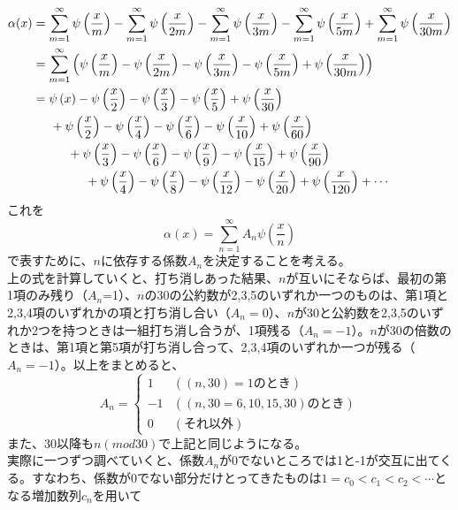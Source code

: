 \documentclass{jsarticle}
\begin{document}
\begin{align*}
\alpha(x)&=\sum_{m=1}^{\infty}\psi\left(\frac{x}{m}\right)-\sum_{m=1}^{\infty}\psi\left(\frac{x}{2m}\right)-\sum_{m=1}^{\infty}\psi\left(\frac{x}{3m}\right)-\sum_{m=1}^{\infty}\psi\left(\frac{x}{5m}\right)+\sum_{m=1}^{\infty}\psi\left(\frac{x}{30m}\right)\\
&=\sum_{m=1}^{\infty}\left(\psi\left(\frac{x}{m}\right)-\psi\left(\frac{x}{2m}\right)-\psi\left(\frac{x}{3m}\right)-\psi\left(\frac{x}{5m}\right)+\psi\left(\frac{x}{30m}\right)\right)\\
&=\psi\left(x\right)-\psi\left(\frac{x}{2}\right)-\psi\left(\frac{x}{3}\right)-\psi\left(\frac{x}{5}\right)+\psi\left(\frac{x}{30}\right)\\
&\hspace{5mm}+\psi\left(\frac{x}{2}\right)-\psi\left(\frac{x}{4}\right)-\psi\left(\frac{x}{6}\right)-\psi\left(\frac{x}{10}\right)+\psi\left(\frac{x}{60}\right)\\
&\hspace{10mm}+\psi\left(\frac{x}{3}\right)-\psi\left(\frac{x}{6}\right)-\psi\left(\frac{x}{9}\right)-\psi\left(\frac{x}{15}\right)+\psi\left(\frac{x}{90}\right)\\
&\hspace{15mm}+\psi\left(\frac{x}{4}\right)-\psi\left(\frac{x}{8}\right)-\psi\left(\frac{x}{12}\right)-\psi\left(\frac{x}{20}\right)+\psi\left(\frac{x}{120}\right)+\cdots\\
\end{align*}
これを
\[\alpha(x)=\sum_{n=1}^{\infty}A_{n}\psi\left(\frac{x}{n}\right)\]
で表すために、\(n\)に依存する係数\(A_{n}\)を決定することを考える。\\
上の式を計算していくと、打ち消しあった結果、\(n\)が互いにそならば、最初の第1項のみ残り（\(A_{n}\)=1）、\(n\)の30の公約数が2,3,5のいずれか一つのものは、第1項と2,3,4項のいずれかの項と打ち消し合い（\(A_{n}=0\)）、\(n\)が30と公約数を2,3,5のいずれか2つを持つときは一組打ち消し合うが、1項残る（\(A_{n}=-1\)）。\(n\)が30の倍数のときは、第1項と第5項が打ち消し合って、2,3,4項のいずれか一つが残る（\(A_{n}=-1\)）。以上をまとめると、
\[
A_{n}=\begin{cases}
1 & ((n,30)=1のとき)\\
-1 & ((n,30=6,10,15,30)のとき)\\
0 & (それ以外)
\end{cases}
\]
また、30以降も\(n(mod30)\)で上記と同じようになる。\\
実際に一つずつ調べていくと、係数\(A_{n}\)が0でないところでは1と-1が交互に出てくる。すなわち、係数が0でない部分だけとってきたものは\(1=c_{0}<c_{1}<c_{2}<\cdots\)となる増加数列\(c_{n}\)を用いて
\end{document}
